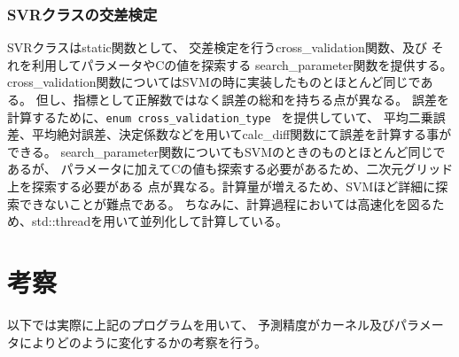 \documentclass[]{jsarticle}
\begin{document}
\subsubsection{SVRクラスの交差検定}
SVRクラスはstatic関数として、
交差検定を行うcross\_validation関数、及び
それを利用してパラメータやCの値を探索する search\_parameter関数を提供する。
cross\_validation関数についてはSVMの時に実装したものとほとんど同じである。
但し、指標として正解数ではなく誤差の総和を持ちる点が異なる。
誤差を計算するために、\verb|enum cross_validation_type | を提供していて、
平均二乗誤差、平均絶対誤差、決定係数などを用いてcalc\_diff関数にて誤差を計算する事ができる。
search\_parameter関数についてもSVMのときのものとほとんど同じであるが、
パラメータに加えてCの値も探索する必要があるため、二次元グリッド上を探索する必要がある
点が異なる。計算量が増えるため、SVMほど詳細に探索できないことが難点である。
ちなみに、計算過程においては高速化を図るため、std::threadを用いて並列化して計算している。

\newpage
\section{考察}
以下では実際に上記のプログラムを用いて、
予測精度がカーネル及びパラメータによりどのように変化するかの考察を行う。
\end{document}
